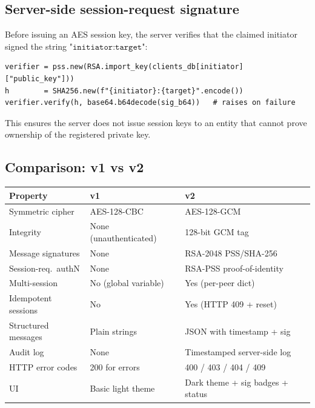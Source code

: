 \documentclass[12pt,a4paper]{article}
\begin{document}
\subsection{Server-side session-request signature}

Before issuing an AES session key, the server verifies that the claimed initiator signed the string \(\texttt{"initiator:target"}\):

\begin{lstlisting}
verifier = pss.new(RSA.import_key(clients_db[initiator]["public_key"]))
h        = SHA256.new(f"{initiator}:{target}".encode())
verifier.verify(h, base64.b64decode(sig_b64))   # raises on failure
\end{lstlisting}

This ensures the server does not issue session keys to an entity that cannot prove ownership of the registered private key.

\subsection{Comparison: v1 vs v2}

\begin{center}
\begin{tabular}{lll}
\toprule
\textbf{Property} & \textbf{v1} & \textbf{v2} \\
\midrule
Symmetric cipher     & AES-128-CBC          & AES-128-GCM \\
Integrity            & None (unauthenticated) & 128-bit GCM tag \\
Message signatures   & None                 & RSA-2048 PSS/SHA-256 \\
Session-req.\ authN  & None                 & RSA-PSS proof-of-identity \\
Multi-session        & No (global variable) & Yes (per-peer dict) \\
Idempotent sessions  & No                   & Yes (HTTP 409 + reset) \\
Structured messages  & Plain strings        & JSON with timestamp + sig \\
Audit log            & None                 & Timestamped server-side log \\
HTTP error codes     & 200 for errors       & 400 / 403 / 404 / 409 \\
UI                   & Basic light theme    & Dark theme + sig badges + status \\
\bottomrule
\end{tabular}
\end{center}
\end{document}
